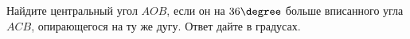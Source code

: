 \begin{ex}
	\begin{condition}
		Найдите центральный угол \( AOB \), если он на \( 36  \degree\)  больше вписанного угла \( ACB \), опирающегося на ту же дугу. Ответ дайте в градусах.
	\end{condition}
\end{ex}
